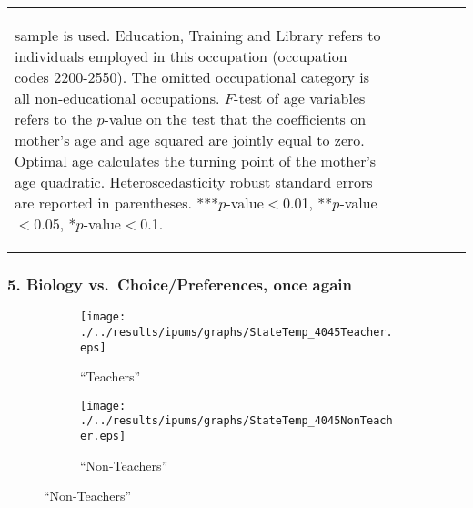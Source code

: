 \documentclass[10pt,letterpaper,subeqn]{beamer}
\begin{document}
\begin{frame}
\begin{table}[htbp]
{\begin{tabular}{l*{5}{c}}
{\begin{footnotesize}
sample is used. Education, Training and Library refers to individuals
 employed in this occupation (occupation codes 2200-2550).  The omitted
occupational category is all non-educational occupations. $F$-test of age variables refers to the $p$-value on the test that               the coefficients on mother's age and age squared are jointly equal               to zero.  Optimal age calculates the turning point of the mother's age               quadratic.  Heteroscedasticity robust standard errors are reported in              parentheses. ***$p$-value$<$0.01, **$p$-value$<$0.05, *$p$-value$<$0.1.
\end{footnotesize}}\end{tabular}}\end{table}
\hyperlink{occGraph}{}
\end{frame}



\begin{frame}
\frametitle{5. Biology vs.\ Choice/Preferences, once again}
\begin{figure}[htpb!]
  \begin{center}
    \caption{Temperature and Good Season: older mothers (40-45 yo)}
    \label{bqFig:coldTeach4045}
    \begin{subfigure}{.5\textwidth}
      \centering
      \texttt{[image: ./../results/ipums/graphs/StateTemp\_4045Teacher.eps]}
      \caption{``Teachers''}
      \label{fig:Educ3}
    \end{subfigure}%
    \begin{subfigure}{.5\textwidth}
      \centering
      \texttt{[image: ./../results/ipums/graphs/StateTemp\_4045NonTeacher.eps]}
      \caption{``Non-Teachers''}
      \label{fig:NonEduc3}
    \end{subfigure}
  \end{center}
\end{figure}
\end{frame}
\end{document}

